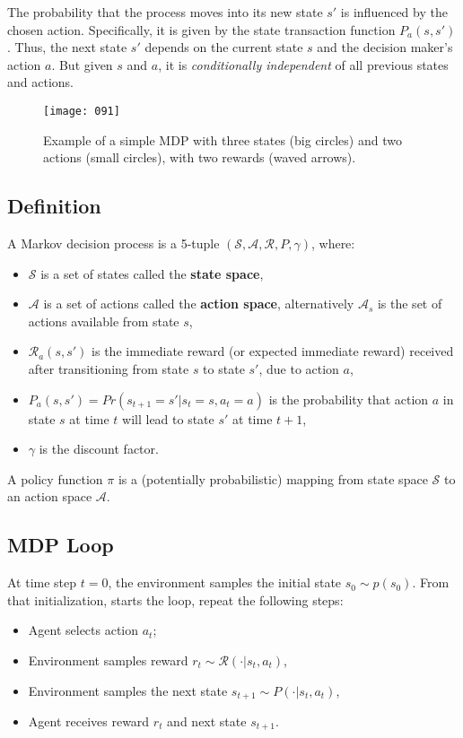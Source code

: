The probability that the process moves into its new state \(s'\) is influenced by the chosen action. Specifically, it is given by the state transaction function \(P_a(s,s')\). Thus, the next state \(s'\) depends on the current state \(s\) and the decision maker's action \(a\). But given \(s\) and \(a\), it is \emph{conditionally independent} of all previous states and actions.

\begin{figure}[t!]
    \centering
    \texttt{[image: 091]}
    \caption{Example of a simple MDP with three states (big circles) and two actions (small circles), with two rewards (waved arrows).}
    \label{fig:091}
\end{figure}

\subsection{Definition}
A Markov decision process is a 5-tuple \((\mathcal{S}, \mathcal{A}, \mathcal{R}, P, \gamma)\), where:
\begin{itemize}[topsep={0pt}, partopsep={0pt}]
    \itemsep0pt
    \item \(\mathcal{S}\) is a set of states called the \textbf{state space},
    \item \(\mathcal{A}\) is a set of actions called the \textbf{action space}, alternatively \(\mathcal{A}_s\) is the set of actions available from state \(s\),
    \item \(\mathcal{R}_a(s,s')\) is the immediate reward (or expected immediate reward) received after transitioning from state \(s\) to state \(s'\), due to action \(a\),
    \item \(P_a(s,s') = Pr(s_{t+1}=s' | s_t=s, a_t=a)\) is the probability that action \(a\) in state \(s\) at time \(t\) will lead to state \(s'\) at time \(t+1\),
    \item \(\gamma\) is the discount factor. 
\end{itemize}
A policy function \(\pi\) is a (potentially probabilistic) mapping from state space \(\mathcal{S}\) to an action space \(\mathcal{A}\).

\subsection{MDP Loop}
At time step \(t=0\), the environment samples the initial state \(s_0 \sim p(s_0)\). From that initialization, starts the loop, repeat the following steps:
\begin{itemize}
    \item Agent selects action \(a_t\);
    \item Environment samples reward \(r_t \sim \mathcal{R}( \cdot | s_t, a_t)\),
    \item Environment samples the next state \(s_{t+1} \sim P( \cdot | s_t, a_t)\),
    \item Agent receives reward \(r_t\) and next state \(s_{t+1}\).
\end{itemize}

